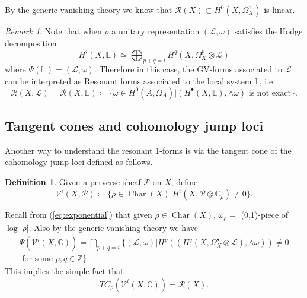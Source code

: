 \documentclass[11pt,reqno]{amsart}
\theoremstyle{definition}
\newtheorem{definition}[theorem]{Definition}
\theoremstyle{remark}
\newtheorem{remark}[theorem]{Remark}
\theoremstyle{cited}
\theoremstyle{citeddef}
\DeclareMathOperator{\Char}{Char}
\def\Pic{{\rm Pic}}
\newcommand{\sL}{\mathcal{L}}
\newcommand{\sM}{\mathcal{M}}
\newcommand{\sP}{\mathcal{P}}
\newcommand{\sR}{\mathcal{R}}
\newcommand\sV{{\mathcal V}}
\newcommand{\bbC}{\mathbb{C}}
\newcommand{\bbL}{\mathbb{L}}
\newcommand{\bbZ}{\mathbb{Z}}
\begin{document}
By the generic vanishing theory \cite[Theorem 3]{Ara}
we know that $\sR(X)\subset H^0(X,\Omega_X^1)$ is linear.
\begin{remark}
Note that when $\rho$ a unitary representation 
$(\sL, \omega)$ satisfies the Hodge decomposition
\[H^i(X, \bbL) \simeq \bigoplus_{p+q=i}H^{q}(X, \Omega_X^p\otimes \sL)\]
where $\Psi(\bbL ) = (\sL,\omega)$.
Therefore in this case, the GV-forms associated to 
$\sL$ can be interpreted
as Resonant forms associated to the local system $\bbL$,
i.e.\ 
\[\sR(X, \sL) = \sR(X, \bbL) \coloneqq \{\omega\in H^0(A,\Omega_A^1)| (H^{\bullet}(X,\bbL),\wedge\omega) \text{ is not exact}\}.\]
\end{remark} 

\subsection{Tangent cones and cohomology jump loci}
\label{sub:tc} Another way to understand the resonant 1-forms is via the tangent cone of the cohomology jump loci defined
as follows.
\begin{definition}
Given a perverse sheaf $\sP$ on $X$, define
\[\sV^i(X,\sP) \coloneqq \{\rho\in\Char(X)|
H^i(X,\sP\otimes \bbC_{\rho})\neq 0\}.\]
\end{definition}
Recall from (\ref{eq:exponential}) that given $\rho\in \Char(X)$, $\omega_{\rho} = $ (0,1)-piece of $\log|\rho|$. 
Also by the generic vanishing theory \cite[Theorem 3]{Ara} we have 
\begin{equation}\begin{split}
\Psi(\sV^i(X,\bbC))
=\bigcap_{p+q = i}\{(\sL,\omega)| H^p((H^q(X,\Omega_X^{\bullet}\otimes \sL),\wedge\omega)) \neq 0
\\ \text{ for some } p,q\in\bbZ\}.
\end{split}\label{eq:}
\end{equation}
This implies the simple fact that
\[TC_{\rho}(\sV^i(X,\bbC)) = \sR(X).\]
\end{document}
